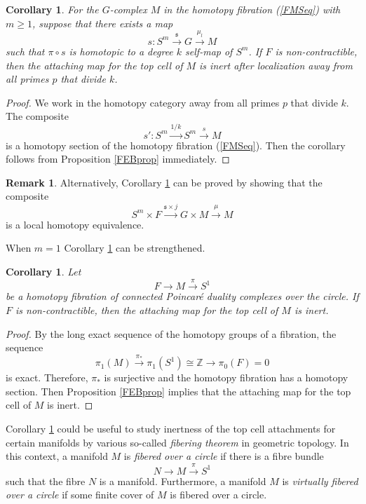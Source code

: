 \documentclass[a4]{amsart}
\newtheorem{corollary}[theorem]{Corollary}
\theoremstyle{definition}
\newtheorem{remark}[theorem]{Remark}
\begin{document}
\begin{sloppypar}
\begin{corollary}\label{FMScor}
For the $G$-complex $M$ in the homotopy fibration (\ref{FMSeq}) with $m\geq 1$, suppose that there exists a map 
\[
s: S^m\stackrel{\mathfrak{s}}{\longrightarrow} G\stackrel{\mu_l}{\longrightarrow} M
\]
such that $\pi\circ s$ is homotopic to a degree $k$ self-map of $S^m$. If $F$ is non-contractible, then the attaching map for the top cell of $M$ is inert after localization away from all primes $p$ that divide $k$.  
\end{corollary}
\begin{proof}
We work in the homotopy category away from all primes $p$ that divide $k$. The composite  
\[
s': S^m\stackrel{1/k}{\longrightarrow} S^m\stackrel{s}{\longrightarrow} M
\]
is a homotopy section of the homotopy fibration (\ref{FMSeq}). Then the corollary follows from Proposition \ref{FEBprop} immediately. 
\end{proof}
\begin{remark}
Alternatively, Corollary \ref{FMScor} can be proved by showing that the composite
\[
S^m\times F\stackrel{\mathfrak{s}\times j}{\longrightarrow} G\times M\stackrel{\mu}{\longrightarrow} M
\]
is a local homotopy equivalence. 
\end{remark}
When $m=1$ Corollary \ref{FMScor} can be strengthened.  
\begin{corollary}\label{FMS1cor}
Let 
\[
F\stackrel{}{\longrightarrow} M\stackrel{\pi}{\longrightarrow} S^1
\]
be a homotopy fibration of connected Poincar\'{e} duality complexes over the circle. If $F$ is non-contractible, then the attaching map for the top cell of $M$ is inert.
\end{corollary}
\begin{proof}
By the long exact sequence of the homotopy groups of a fibration, the sequence 
\[
\pi_1(M)\stackrel{\pi_\ast}{\longrightarrow} \pi_1(S^1)\cong\mathbb{Z}\stackrel{}{\longrightarrow} \pi_0(F)=0
\]
is exact. Therefore, $\pi_\ast$ is surjective and the homotopy fibration has a homotopy section. Then Proposition \ref{FEBprop} implies that the attaching map for the top cell of $M$ is inert.
\end{proof}
Corollary \ref{FMS1cor} could be useful to study inertness of the top cell attachments for certain manifolds by various so-called {\it fibering theorem} in geometric topology. In this context, a manifold $M$ is {\it fibered over a circle} if there is a fibre bundle
\[
N\stackrel{}{\longrightarrow} M\stackrel{\pi}{\longrightarrow} S^1
\] 
such that the fibre $N$ is a manifold. Furthermore, a manifold $M$ is {\it virtually fibered over a circle} if some finite cover of $M$ is fibered over a circle. 

\end{sloppypar}
\end{document}
